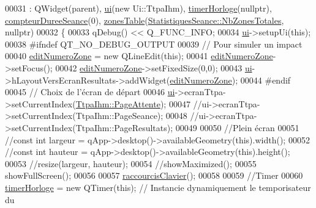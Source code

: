 \begin{DoxyCode}
00031                                 : QWidget(parent), \hyperlink{class_ttpa_ihm_ad5fae1222a667da158c26f3d0f0dce23}{ui}(\textcolor{keyword}{new} Ui::TtpaIhm), 
      \hyperlink{class_ttpa_ihm_a447ad7262efa01d22bc3222e0e470087}{timerHorloge}(\textcolor{keyword}{nullptr}), \hyperlink{class_ttpa_ihm_abb5ab7cc023685e40cb278f0210f276f}{compteurDureeSeance}(0), 
      \hyperlink{class_ttpa_ihm_af77d75f1aa3eb901b9410e5fc465ece8}{zonesTable}(\hyperlink{class_statistiques_seance_aa839f5192cbadd7c3fb3651d62eff8b5afe19f73563963b5160847cdd8c2260c4}{StatistiquesSeance::NbZonesTotales}, \textcolor{keyword}{nullptr})
00032 \{
00033     qDebug() << Q\_FUNC\_INFO;
00034     \hyperlink{class_ttpa_ihm_ad5fae1222a667da158c26f3d0f0dce23}{ui}->setupUi(\textcolor{keyword}{this});
00038 \textcolor{preprocessor}{#ifndef QT\_NO\_DEBUG\_OUTPUT}
00039     \textcolor{comment}{// Pour simuler un impact}
00040     \hyperlink{class_ttpa_ihm_a843f5742ec2289d08e2be94dda2c9128}{editNumeroZone} = \textcolor{keyword}{new} QLineEdit(\textcolor{keyword}{this});
00041     \hyperlink{class_ttpa_ihm_a843f5742ec2289d08e2be94dda2c9128}{editNumeroZone}->setFocus();
00042     \hyperlink{class_ttpa_ihm_a843f5742ec2289d08e2be94dda2c9128}{editNumeroZone}->setFixedSize(0,0);
00043     \hyperlink{class_ttpa_ihm_ad5fae1222a667da158c26f3d0f0dce23}{ui}->hLayoutVersEcranResultats->addWidget(\hyperlink{class_ttpa_ihm_a843f5742ec2289d08e2be94dda2c9128}{editNumeroZone});
00044 \textcolor{preprocessor}{#endif}
00045     \textcolor{comment}{// Choix de l'écran de départ}
00046     \hyperlink{class_ttpa_ihm_ad5fae1222a667da158c26f3d0f0dce23}{ui}->ecranTtpa->setCurrentIndex(\hyperlink{class_ttpa_ihm_aad886f2c7b90b4f990492092f0be9c2ba94101700630d213692269ca864ff87fe}{TtpaIhm::PageAttente});
00047     \textcolor{comment}{//ui->ecranTtpa->setCurrentIndex(TtpaIhm::PageSeance);}
00048     \textcolor{comment}{//ui->ecranTtpa->setCurrentIndex(TtpaIhm::PageResultats);}
00049 
00050     \textcolor{comment}{//Plein écran}
00051     \textcolor{comment}{//const int largeur = qApp->desktop()->availableGeometry(this).width();}
00052     \textcolor{comment}{//const int hauteur = qApp->desktop()->availableGeometry(this).height();}
00053     \textcolor{comment}{//resize(largeur, hauteur);}
00054     \textcolor{comment}{//showMaximized();}
00055     showFullScreen();
00056 
00057     \hyperlink{class_ttpa_ihm_a9d649ace50425bdc2bea311753b4214c}{raccourcisClavier}();
00058 
00059     \textcolor{comment}{//Timer}
00060     \hyperlink{class_ttpa_ihm_a447ad7262efa01d22bc3222e0e470087}{timerHorloge} = \textcolor{keyword}{new} QTimer(\textcolor{keyword}{this}); \textcolor{comment}{// Instancie dynamiquement le temporisateur du
}
\end{DoxyCode}
